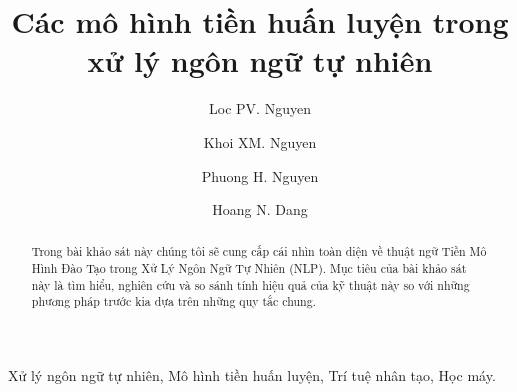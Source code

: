 \begin{frontmatter}
\title{Các mô hình tiền huấn luyện trong xử lý ngôn ngữ tự nhiên}
\author{Loc PV. Nguyen}
\author{Khoi XM. Nguyen}
\author{Phuong H. Nguyen}
\author{Hoang N. Dang}
\address{Faculty of Information Technology, FPT University Global Education, Ho Chi Minh city, Vietnam}



\begin{abstract}
Trong bài khảo sát này chúng tôi sẽ cung cấp cái nhìn toàn diện về thuật ngữ Tiền Mô Hình Đào Tạo trong Xử Lý Ngôn Ngữ Tự Nhiên (NLP). Mục tiêu của bài khảo sát này là tìm hiểu, nghiên cứu và so sánh tính hiệu quả của kỹ thuật này so với những phương pháp trước kia dựa trên những quy tắc chung.
\end{abstract}
\begin{keyword}
Xử lý ngôn ngữ tự nhiên, Mô hình tiền huấn luyện, Trí tuệ nhân tạo, Học máy.
\end{keyword}

\end{frontmatter}

